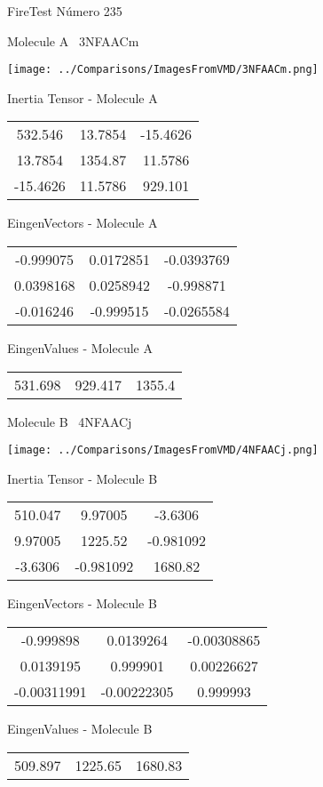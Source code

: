 \vtab[-3cm]
\begin{center}
{\large FireTest \tab Número 235}
\end{center}
\begin{multicols}{2}
\begin{center}

Molecule A \
3NFAACm

\texttt{[image: ../Comparisons/ImagesFromVMD/3NFAACm.png]}

Inertia Tensor - Molecule A \\
\begin{tabular}{|c c c|}
532.546	 & 	13.7854	 & 	-15.4626	 \\
13.7854	 & 	1354.87	 & 	11.5786	 \\
-15.4626	 & 	11.5786	 & 	929.101
\end{tabular}

\vtab
 EingenVectors - Molecule A     \\
\begin{tabular}{|c c c|}
-0.999075	 & 	0.0172851	 & 	-0.0393769	 \\
0.0398168	 & 	0.0258942	 & 	-0.998871	 \\
-0.016246	 & 	-0.999515	 & 	-0.0265584
\end{tabular}

\vtab
 EingenValues - Molecule A     \\
\begin{tabular}{|c c c|}
531.698	 & 	929.417	 & 	1355.4	 \\
\end{tabular}
\columnbreak

Molecule B \
4NFAACj

\texttt{[image: ../Comparisons/ImagesFromVMD/4NFAACj.png]}

Inertia Tensor - Molecule B \\
\begin{tabular}{|c c c|}
510.047	 & 	9.97005	 & 	-3.6306	 \\
9.97005	 & 	1225.52	 & 	-0.981092	 \\
-3.6306	 & 	-0.981092	 & 	1680.82
\end{tabular}

\vtab
 EingenVectors - Molecule B     \\
\begin{tabular}{|c c c|}
-0.999898	 & 	0.0139264	 & 	-0.00308865	 \\
0.0139195	 & 	0.999901	 & 	0.00226627	 \\
-0.00311991	 & 	-0.00222305	 & 	0.999993
\end{tabular}

\vtab
 EingenValues - Molecule B     \\
\begin{tabular}{|c c c|}
509.897	 & 	1225.65	 & 	1680.83	 \\
\end{tabular}

\end{center}
\end{multicols}


